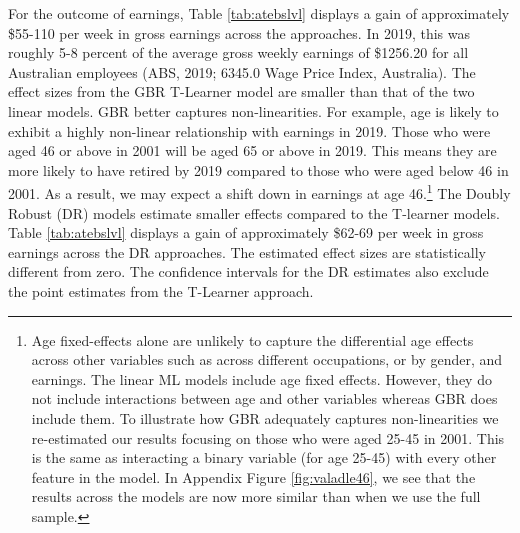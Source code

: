 \documentclass[12pt, a4paper]{article}
\begin{document}
For the outcome of earnings, Table \ref{tab:atebslvl} displays a gain of approximately \$55-110 per week in gross earnings across the approaches. In 2019, this was roughly 5-8 percent of the average gross weekly earnings of \$1256.20 for all Australian employees (ABS, 2019; 6345.0 Wage Price Index, Australia). The effect sizes from the GBR T-Learner model are smaller than that of the two linear models. GBR better captures non-linearities. For example, age is likely to exhibit a highly non-linear relationship with earnings in 2019. Those who were aged 46 or above in 2001 will be aged 65 or above in 2019. This means they are more likely to have retired by 2019 compared to those who were aged below 46 in 2001. As a result, we may expect a shift down in earnings at age 46.\footnote{Age fixed-effects alone are unlikely to capture the differential age effects across other variables such as across different occupations, or by gender, and earnings. The linear ML models include age fixed effects. However, they do not include interactions between age and other variables whereas GBR does include them. To illustrate how GBR adequately captures non-linearities we re-estimated our results focusing on those who were aged 25-45 in 2001. This is the same as interacting a binary variable (for age 25-45) with every other feature in the model. In Appendix Figure \ref{fig:valadle46}, we see that the results across the models are now more similar than when we use the full sample.} The Doubly Robust (DR) models estimate smaller effects compared to the T-learner models. Table \ref{tab:atebslvl} displays a gain of approximately \$62-69 per week in gross earnings across the DR approaches. The estimated effect sizes are statistically different from zero. The confidence intervals for the DR estimates also exclude the point estimates from the T-Learner approach.

\end{document}
